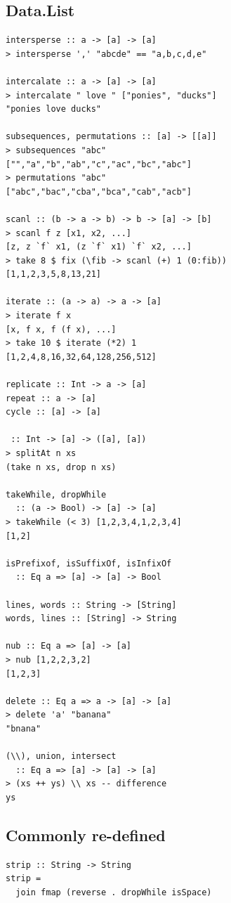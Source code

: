 \begin{multicols}{2}
\begin{box1}
\subsection *{Data.List}
\begin{verbatim}
intersperse :: a -> [a] -> [a]
> intersperse ',' "abcde" == "a,b,c,d,e"

intercalate :: a -> [a] -> [a]
> intercalate " love " ["ponies", "ducks"]
"ponies love ducks"

subsequences, permutations :: [a] -> [[a]]
> subsequences "abc"
["","a","b","ab","c","ac","bc","abc"]
> permutations "abc"
["abc","bac","cba","bca","cab","acb"]

scanl :: (b -> a -> b) -> b -> [a] -> [b]
> scanl f z [x1, x2, ...]
[z, z `f` x1, (z `f` x1) `f` x2, ...]
> take 8 $ fix (\fib -> scanl (+) 1 (0:fib))
[1,1,2,3,5,8,13,21]

iterate :: (a -> a) -> a -> [a]
> iterate f x
[x, f x, f (f x), ...]
> take 10 $ iterate (*2) 1
[1,2,4,8,16,32,64,128,256,512]

replicate :: Int -> a -> [a]
repeat :: a -> [a]
cycle :: [a] -> [a]

 :: Int -> [a] -> ([a], [a])
> splitAt n xs
(take n xs, drop n xs)

takeWhile, dropWhile
  :: (a -> Bool) -> [a] -> [a]
> takeWhile (< 3) [1,2,3,4,1,2,3,4]
[1,2]

isPrefixof, isSuffixOf, isInfixOf
  :: Eq a => [a] -> [a] -> Bool

lines, words :: String -> [String]
words, lines :: [String] -> String

nub :: Eq a => [a] -> [a]
> nub [1,2,2,3,2]
[1,2,3]

delete :: Eq a => a -> [a] -> [a]
> delete 'a' "banana"
"bnana"

(\\), union, intersect
  :: Eq a => [a] -> [a] -> [a]
> (xs ++ ys) \\ xs -- difference
ys
\end{verbatim}
\end{box1}

\begin{box2}
\subsection *{Commonly re-defined}
\begin{verbatim}
strip :: String -> String
strip =
  join fmap (reverse . dropWhile isSpace)


\end{verbatim}
\end{box2}
\end{multicols}
